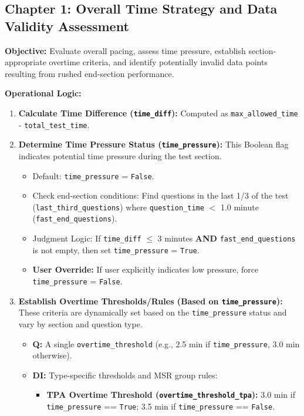 \documentclass{article}
\begin{document}
\subsection{Chapter 1: Overall Time Strategy and Data Validity Assessment}

\textbf{Objective:} Evaluate overall pacing, assess time pressure, establish section-appropriate overtime criteria, and identify potentially invalid data points resulting from rushed end-section performance.

\textbf{Operational Logic:}
\begin{enumerate}
    \item \textbf{Calculate Time Difference (\texttt{time\_diff}):} Computed as \texttt{max\_allowed\_time} - \texttt{total\_test\_time}.
    \item \textbf{Determine Time Pressure Status (\texttt{time\_pressure}):} This Boolean flag indicates potential time pressure during the test section. 
        \begin{itemize}
            \item Default: \texttt{time\_pressure} = \texttt{False}.
            \item Check end-section conditions: Find questions in the last 1/3 of the test (\texttt{last\_third\_questions}) where \texttt{question\_time} $<$ 1.0 minute (\texttt{fast\_end\_questions}).
            \item Judgment Logic: If \texttt{time\_diff} $\leq$ 3 minutes \textbf{AND} \texttt{fast\_end\_questions} is not empty, then set \texttt{time\_pressure} = \texttt{True}.
            \item \textbf{User Override:} If user explicitly indicates low pressure, force \texttt{time\_pressure} = \texttt{False}.
        \end{itemize}
    \item \textbf{Establish Overtime Thresholds/Rules (Based on \texttt{time\_pressure}):} These criteria are dynamically set based on the \texttt{time\_pressure} status and vary by section and question type.
    \begin{itemize}
        \item \textbf{Q:} A single \texttt{overtime\_threshold} (e.g., 2.5 min if \texttt{time\_pressure}, 3.0 min otherwise).
        \item \textbf{DI:} Type-specific thresholds and MSR group rules:
        \begin{itemize}
            \item \textbf{TPA Overtime Threshold (\texttt{overtime\_threshold\_tpa}):} 3.0 min if \texttt{time\_pressure} == \texttt{True}; 3.5 min if \texttt{time\_pressure} == \texttt{False}.

\end{itemize}
\end{itemize}
\end{enumerate}
\end{document}
